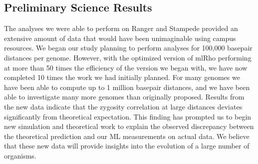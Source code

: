 \documentclass{sig-alternate}
\begin{document}





\subsection{Preliminary Science Results}
The analyses we were able to perform on Ranger and Stampede provided an extensive amount of data that would
have been unimaginable using campus resources. We began our study planning to perform analyses for 100,000
basepair distances per genome. However, with the optimized version of mlRho performing at more than 50
times the efficiency of the version we began with, we have now completed 10 times the work we had initially
planned. For many genomes we have been able to compute up to 1 million basepair distances, and we have been
able to investigate many more genomes than originally proposed. Results from the new data indicate that the
zygosity correlation at large distances deviates significantly from theoretical expectation. This finding has
prompted us to begin new simulation and theoretical work to explain the observed discrepancy between the
theoretical prediction and our ML measurements on actual data. We believe that these new data will provide 
insights into the evolution of a large number of organisms.
\end{document}

